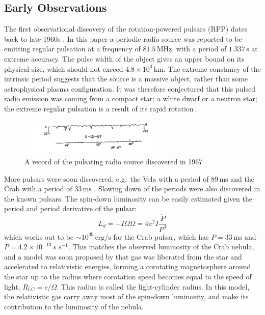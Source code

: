 \subsection{Early Observations}

The first observational discovery of the rotation-powered pulsars (RPP) dates
back to late 1960s \citep{hewish_observation_1968}. In this paper a periodic
radio source was reported to be emitting regular pulsation at a frequency of
$81.5\,\mathrm{MHz}$, with a period of $1.337\,\mathrm{s}$ at extreme accuracy.
The pulse width of the object gives an upper bound on its physical size, which
should not exceed $4.8\times 10^3\,\mathrm{km}$. The extreme constancy of the
intrinsic period suggests that the source is a massive object, rather than some
astrophysical plasma configuration. It was therefore conjectured that this
pulsed radio emission was coming from a compact star: a white dwarf or a neutron
star; the extreme regular pulsation is a result of its rapid rotation
\citep{gold_rotating_1968}.

\begin{figure}[h]
  \centering
  \includegraphics[width=0.6\textwidth]{pics/intro/pulses.png}
  \caption[A record of pulsating radio source]{A record of the pulsating radio
    source discovered in 1967 \citep{hewish_observation_1968}}
  \label{fig:pulse}
\end{figure}

More pulsars were soon discovered, e.g.\ the Vela with a period of
$89\,\mathrm{ms}$ \citep{large_pulsar_1968} and the Crab with a period of
$33\,\mathrm{ms}$ \citep{lovelace_pulsar_1968}. Slowing down of the periods were
also discovered in the known pulsars. The spin-down luminosity can be easily
estimated given the period and period derivative of the pulsar:
\begin{equation}
  \label{eq:spindown-power}
  L_{d} = -I\Omega\dot{\Omega} = 4\pi^2 I\frac{\dot{P}}{P^3}
\end{equation}
which works out to be $\sim 10^{39}\,\mathrm{erg/s}$ for the Crab pulsar, which
has $P = 33\,\mathrm{ms}$ and $\dot{P} = 4.2\times 10^{-13}\,{s\;s^{-1}}$. This
matches the observed luminosity of the Crab nebula, and a model was soon
proposed by \citet{gold_rotating_1969} that gas was liberated from the star and
accelerated to relativistic energies, forming a corotating magnetosphere around
the star up to the radius where corotation speed becomes equal to the speed of
light, $R_\mathrm{LC} = c/\Omega$. This radius is called the light-cylinder
radius. In this model, the relativistic gas carry away most of the spin-down
luminosity, and make its contribution to the luminosity of the nebula.

